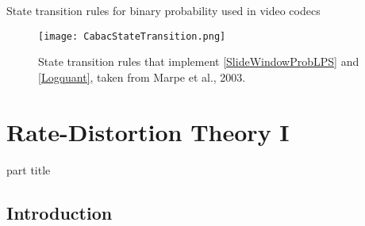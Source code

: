 \begin{frame}{State transition rules for binary probability used in video codecs}
\begin{figure}
\texttt{[image: CabacStateTransition.png]}
\captionsetup{labelformat=empty}
\caption{State transition rules that implement \eqref{SlideWindowProbLPS} and \eqref{Logquant}, taken from Marpe et al., 2003.}
\end{figure}

\end{frame}



\section{Rate-Distortion Theory I}


\begin{frame}
 \vspace{8.0ex}
\begin{center}
\begin{beamercolorbox}[sep=12pt,center]{part title}
\insertsection\par
\end{beamercolorbox}
\end{center}
\end{frame}

\subsection{Introduction}

